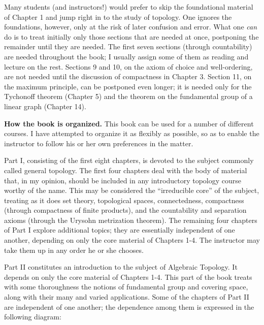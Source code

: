 Many students (and instructors!) would prefer to skip the foundational material of 
Chapter 1 and jump right in to the study of topology. One ignores the foundations, 
however, only at the risk of later confusion and error. What one \textit{can} do is 
to treat initially only those sections that are needed at once, postponing the 
remainder until they are needed. The first seven sections (through countability) 
are needed throughout the book; I usually assign some of them as reading and lecture 
on the rest. Sections 9 and 10, on the axiom of choice and well-ordering, are not 
needed until the discussion of compactness in Chapter 3. Section 11, on the maximum 
principle, can be postponed even longer; it is needed only for the Tychonoff theorem 
(Chapter 5) and the theorem on the fundamental group of a linear graph (Chapter 14).

\noindent\textbf{How the book is organized.} This book can be used for a number of 
different courses. I have attempted to organize it as flexibly as possible, so as to 
enable the instructor to follow his or her own preferences in the matter.

Part I, consisting of the first eight chapters, is devoted to the subject commonly 
called general topology. The first four chapters deal with the body of material that, 
in my opinion, should be included in any introductory topology course worthy of 
the name. This may be considered the ``irreducible core'' of the subject, treating as 
it does set theory, topological spaces, connectedness, compactness (through compactness of 
finite products), and the countability and separation axioms (through the Urysohn 
metrization theorem). The remaining four chapters of Part I explore additional topics; 
they are essentially independent of one another, depending on only the core material 
of Chapters 1-4. The instructor may take them up in any order he or she chooses.

Part II constitutes an introduction to the subject of Algebraic Topology. 
It depends on only the core material of Chapters 1-4. This part of the book treats 
with some thoroughness the notions of fundamental group and covering space, along 
with their many and varied applications. Some of the chapters of Part II are 
independent of one another; the dependence among them is expressed in the following
diagram:


